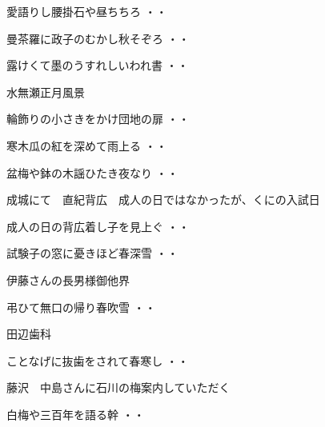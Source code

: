 \begin{shiika}愛語りし腰掛石や昼ちちろ
\hfill{・・}\end{shiika}
\vspace{0.6cm}
\begin{shiika}曼茶羅に政子のむかし秋そぞろ
\hfill{・・}\end{shiika}
\vspace{0.6cm}
\begin{shiika}露けくて墨のうすれしいわれ書
\hfill{・・}\end{shiika}
\vspace{0.6cm}
水無瀬正月風景
\begin{shiika}輪飾りの小さきをかけ団地の扉
\hfill{・・}\end{shiika}
\begin{shiika}寒木瓜の紅を深めて雨上る
\hfill{・・}\end{shiika}
\begin{shiika}盆梅や鉢の木謡ひたき夜なり
\hfill{・・}\end{shiika}
\vspace{0.6cm}
成城にて　直紀背広　成人の日ではなかったが、くにの入試日
\begin{shiika}成人の日の背広着し子を見上ぐ
\hfill{・・}\end{shiika}
\begin{shiika}試験子の窓に憂きほど春深雪
\hfill{・・}\end{shiika}
\vspace{0.6cm}
伊藤さんの長男様御他界
\begin{shiika}弔ひて無口の帰り春吹雪
\hfill{・・}\end{shiika}
\vspace{0.6cm}
田辺歯科
\begin{shiika}ことなげに抜歯をされて春寒し
\hfill{・・}\end{shiika}
\vspace{0.6cm}
藤沢　中島さんに石川の梅案内していただく
\begin{shiika}白梅や三百年を語る幹
\hfill{・・}\end{shiika}
